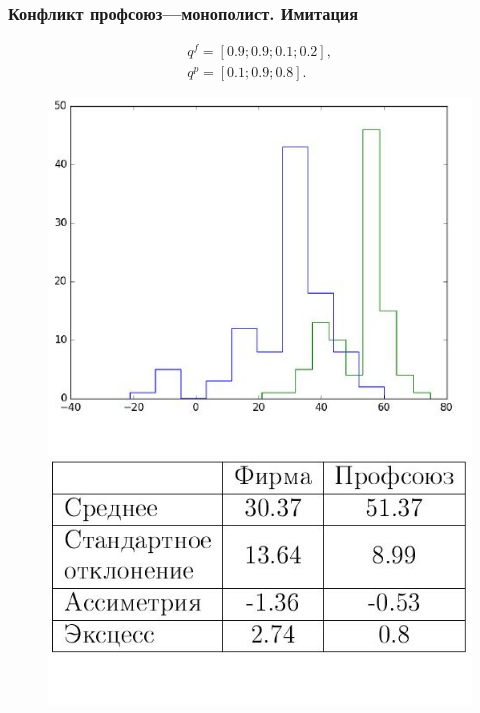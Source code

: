 \documentclass {beamer}
\begin{document}
\begin{frame}
\frametitle{Конфликт профсоюз---монополист. Имитация}
  \begin{gather*}
  q^f = \left[ 0.9; 0.9; 0.1; 0.2 \right], \\
  q^p = \left[ 0.1; 0.9; 0.8 \right].
  \end{gather*}
	\begin{figure}
		\begin{minipage}[b]{0.45\textwidth}
			
			\includegraphics[width=\textwidth]{firm4}
		\end{minipage}
		\begin{minipage}[b]{0.45\textwidth}
			
			\includegraphics[width=\textwidth]{firmtable4}
		\end{minipage}
		
	\end{figure}
\end{frame}
\end{document}
